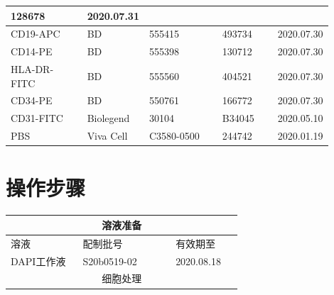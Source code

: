 \documentclass[UTF8,10pt,a4paper,fontset=fandol]{ctexart}
\newcommand{\fieldvalue}[1]{#1}
\newcommand{\handwritten}[1]{#1}
\begin{document}
\begin{tabular}{|p{0.28\linewidth}|p{0.16\linewidth}|p{0.27\linewidth}|p{0.19\linewidth}|}
\fieldvalue{\handwritten{128678}} &
\fieldvalue{\handwritten{2020.07.31}} \\
\hline
CD19-APC & BD & 555415 &
\fieldvalue{\handwritten{493734}} &
\fieldvalue{\handwritten{2020.07.30}} \\
\hline
CD14-PE & BD & 555398 &
\fieldvalue{\handwritten{130712}} &
\fieldvalue{\handwritten{2020.07.30}} \\
\hline
HLA-DR-FITC & BD & 555560 &
\fieldvalue{\handwritten{404521}} &
\fieldvalue{\handwritten{2020.07.30}} \\
\hline
CD34-PE & BD & 550761 &
\fieldvalue{\handwritten{166772}} &
\fieldvalue{\handwritten{2020.07.30}} \\
\hline
CD31-FITC & Biolegend & 30104 &
\fieldvalue{\handwritten{B34045}} &
\fieldvalue{\handwritten{2020.05.10}} \\
\hline
PBS & Viva Cell & C3580-0500 &
\fieldvalue{\handwritten{244742}} &
\fieldvalue{\handwritten{2020.01.19}} \\
\hline
\end{tabular}

\section{操作步骤}

\begin{tabular}{|p{0.28\linewidth}|p{0.36\linewidth}|p{0.26\linewidth}|}
\hline
\multicolumn{3}{c|}{溶液准备} \\
\hline
溶液 & 配制批号 & 有效期至 \\
\hline
DAPI工作液 &
\fieldvalue{\handwritten{S20b0519-02}} &
\fieldvalue{\handwritten{2020.08.18}} \\
\hline
\multicolumn{3}{c|}{细胞处理} \\
\hline
\end{tabular}
\end{document}
